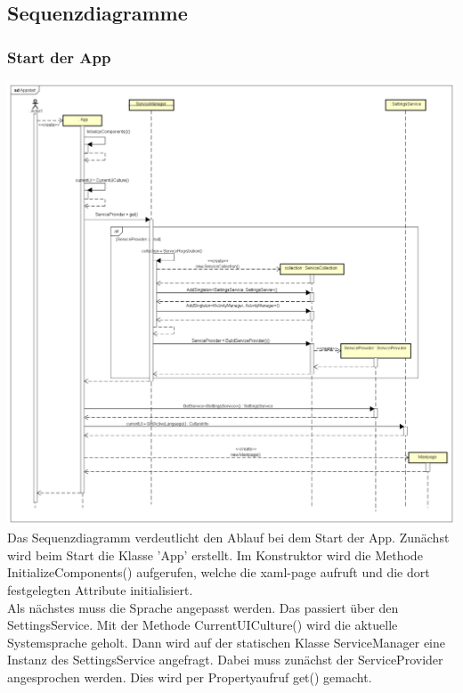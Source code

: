 \documentclass[a4paper,12pt]{article}
\begin{document}
\subsection{Sequenzdiagramme}

\subsubsection{Start der App}

\includegraphics[width=1.1\textwidth]{./Diagramme/AppstartSeqDia.png}\\
Das Sequenzdiagramm verdeutlicht den Ablauf bei dem Start der App. Zunächst wird beim Start die Klasse 'App' erstellt. 
Im Konstruktor wird die Methode InitializeComponents() aufgerufen, welche die xaml-page aufruft und die dort festgelegten Attribute initialisiert.\\

Als nächstes muss die Sprache angepasst werden. Das passiert über den SettingsService.
Mit der Methode CurrentUICulture() wird die aktuelle Systemsprache geholt. Dann wird auf der statischen Klasse ServiceManager eine Instanz des SettingsService angefragt. Dabei muss zunächst der ServiceProvider angesprochen werden. Dies wird per Propertyaufruf get() gemacht.\\
\end{document}
